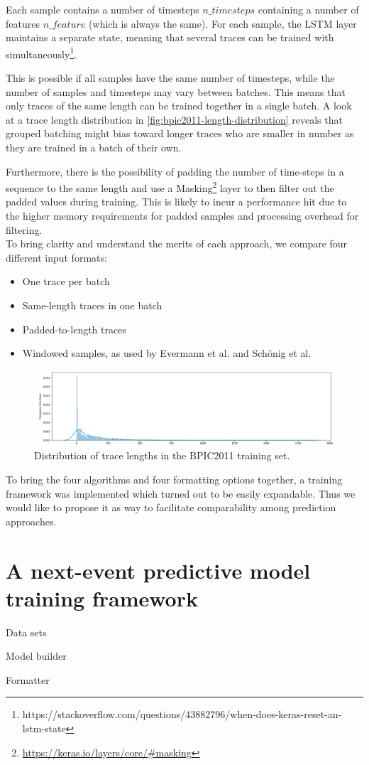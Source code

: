 Each sample contains a number of timesteps $n\_timesteps$ containing a number of features $n\_feature$ (which is always the same). For each sample, the LSTM layer maintains a separate state, meaning that several traces can be trained with simultaneously\footnote{https://stackoverflow.com/questions/43882796/when-does-keras-reset-an-lstm-state}.

This is possible if all samples have the same number of timesteps, while the number of samples and timesteps may vary between batches. This means that only traces of the same length can be trained together in a single batch. A look at a trace length distribution in \autoref{fig:bpic2011-length-distribution} reveals that grouped batching might bias toward longer traces who are smaller in number as they are trained in a batch of their own.

Furthermore, there is the possibility of padding the number of time-steps in a sequence to the same length and use a Masking\footnote{\url{https://keras.io/layers/core/\#masking}} layer to then filter out the padded values during training. This is likely to incur a performance hit due to the higher memory requirements for padded samples and processing overhead for filtering.\\

To bring clarity and understand the merits of each approach, we compare four different input formats:
\begin{itemize}
    \item One trace per batch
    \item Same-length traces in one batch
    \item Padded-to-length traces
    \item Windowed samples, as used by Evermann et al. and Schönig et al.
\end{itemize}

\begin{figure}
    \centering
    \includegraphics[width=\textwidth]{gfx/frequency-distribution.png}
    \caption{Distribution of trace lengths in the BPIC2011 training set.}
    \label{fig:bpic2011-length-distribution}
\end{figure}

To bring the four algorithms and four formatting options together, a training framework was implemented which turned out to be easily expandable. Thus we would like to propose it as way to facilitate comparability among prediction approaches.

\section{A next-event predictive model training framework}
\label{sec:contrib:training-framework}
Data sets

Model builder

Formatter